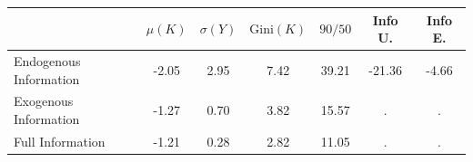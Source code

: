 \def\sym#1{\ifmmode^{#1}\else\(^{#1}\)\fi}

\begin{tabular}{lcccccc}
\toprule
\toprule
                  & $\mu(K)$ & $\sigma(Y)$ & $\text{Gini}(K)$ & $90/50$  & Info U. & Info E.\\
\midrule
Endogenous Information & -2.05 & 2.95 & 7.42 & 39.21 & -21.36 & -4.66\\ 
[1em] Exogenous Information & -1.27 & 0.70 & 3.82 & 15.57 & . & .\\ 
[1em] Full Information & -1.21 & 0.28 & 2.82 & 11.05 & . & .\\ 
\bottomrule
\bottomrule
\end{tabular}
